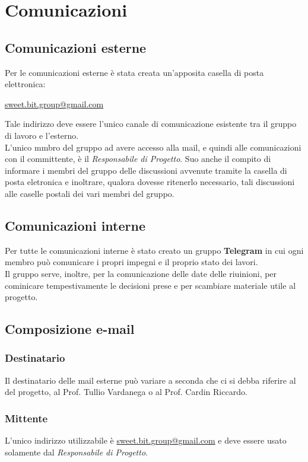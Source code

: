 \section{Comunicazioni}
  \subsection{Comunicazioni esterne}
    Per le comunicazioni esterne è stata creata un'apposita casella di posta elettronica:\\
      \begin{center}
        \href{mailto:sweet.bit.group@gmail.com}{sweet.bit.group@gmail.com}
      \end{center}
    Tale indirizzo deve essere l’unico canale di comunicazione esistente tra il gruppo di lavoro e l’esterno.\\
    L'unico mmbro del gruppo ad avere accesso alla mail, e quindi alle comunicazioni con il committente, è il \emph{Responsabile di Progetto}.
    Suo anche il compito di informare i membri del gruppo delle discussioni avvenute tramite la casella di posta eletronica e inoltrare, qualora dovesse ritenerlo necessario,
    tali discussioni alle caselle postali dei vari membri del gruppo.
  \subsection{Comunicazioni interne}
    Per tutte le comunicazioni interne è stato creato un gruppo \textbf{Telegram} in cui ogni membro può comunicare i propri impegni e il proprio stato dei lavori.\\
    Il gruppo serve, inoltre, per la comunicazione delle date delle riuinioni, per cominicare tempestivamente le decisioni prese e per scambiare materiale utile al progetto.
  \subsection{Composizione e-mail}
    \subsubsection{Destinatario}
      Il destinatario delle mail esterne può variare a seconda che ci si debba riferire al  del progetto, al Prof. Tullio Vardanega o al Prof. Cardin Riccardo.
    \subsubsection{Mittente}
      L’unico indirizzo utilizzabile è \href{mailto:sweet.bit.group@gmail.com}{sweet.bit.group@gmail.com} e deve essere usato solamente dal \emph{Responsabile di Progetto}.
